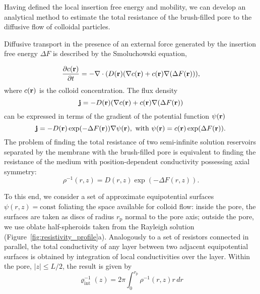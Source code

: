 \documentclass[12pt, a4paper]{article}
\begin{document}
Having defined the local insertion free energy and mobility, we can develop an analytical method to estimate the total resistance of the brush-filled pore to the diffusive flow of colloidal particles.

Diffusive transport in the presence of an external force generated by the insertion free energy $\Delta F$ is described by the Smoluchowski equation,

\begin{equation}
    \frac{\partial c(\bold r)}{\partial t}=-{\bold \nabla}\cdot (D(\bold r)({\bold \nabla}c({\bold r})+c({\bold r}){\bold \nabla}(\Delta F({\bold  r}))),
    \label{eq:Smoluch}
\end{equation}
where $c(\bold r)$ is the colloid concentration. The flux density 
\begin{equation}
    \bold j=- D(\bold r)({\bold \nabla}c({\bold r})+c({\bold r}){\bold \nabla}(\Delta F({\bold  r}))
    \label{eq:j}
\end{equation}
can be expressed in terms of the gradient of the potential function $\psi(\bold r)$
\begin{equation}
    \bold j=- D(\bold r) \exp(-\Delta F({\bold  r}))  {\bold \nabla} \psi(\bold r), \text{ with } \psi(\bold r)=c(\bold r)\exp(\Delta F(\bold r)).
    \label{eq:psi}
\end{equation}
The problem of finding the total resistance of two semi-infinite solution reservoirs separated by the membrane with the brush-filled pore is equivalent to finding the resistance of the medium with position-dependent conductivity possessing axial symmetry:
\begin{equation}
    \rho^{-1} (r,z)= D(r,z)\exp(-\Delta F(r,z)).
    \label{eq:rho}
\end{equation}


To this end, we consider a set of approximate equipotential surfaces $\psi(r,z)=\text{const}$ foliating the space available for colloid flow: inside the pore, the surfaces are taken as  discs of radius $r_{\text{p}}$ normal to the pore axis; outside the pore, we use oblate half-spheroids taken from the Rayleigh solution \cite{Strutt1878} (Figure~\ref{fig:resistivity_profile}a).
Analogously to a set of resistors connected in parallel, the total conductivity of any layer between two adjacent equipotential surfaces is obtained by integration of local conductivities over the layer. Within the pore, $|z|\leq L/2$, the result is given by
\begin{equation}
\varrho_{\text{int}}^{-1}(z)= 2\pi\int_{0}^{r_{\text{p}}^{}} \rho^{-1}(r,z) r \, dr
\label{eq:varrho1}
\end{equation}
\end{document}
